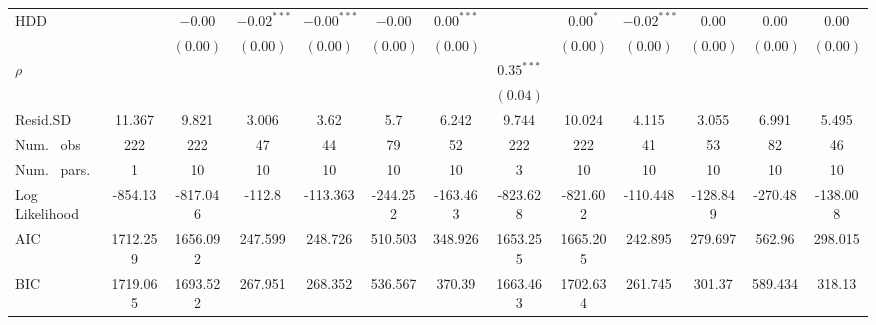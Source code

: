 \begin{table}
\begin{center}
\begin{tabular}{l c c c c c c c c c c c c}
HDD                               &               & $-0.00$       & $-0.02^{***}$ & $-0.00^{***}$  & $-0.00$        & $0.00^{***}$  &               & $0.00^{*}$    & $-0.02^{***}$ & $0.00$         & $0.00$        & $0.00$         \\
                                  &               & $(0.00)$      & $(0.00)$      & $(0.00)$       & $(0.00)$       & $(0.00)$      &               & $(0.00)$      & $(0.00)$      & $(0.00)$       & $(0.00)$      & $(0.00)$       \\
$\rho$                            &               &               &               &                &                &               & $0.35^{***}$  &               &               &                &               &                \\
                                  &               &               &               &                &                &               & $(0.04)$      &               &               &                &               &                \\
\hline
Resid.SD                          & 11.367        & 9.821         & 3.006         & 3.62           & 5.7            & 6.242         & 9.744         & 10.024        & 4.115         & 3.055          & 6.991         & 5.495          \\
Num. \ obs                        & 222           & 222           & 47            & 44             & 79             & 52            & 222           & 222           & 41            & 53             & 82            & 46             \\
Num. \ pars.                      & 1             & 10            & 10            & 10             & 10             & 10            & 3             & 10            & 10            & 10             & 10            & 10             \\
Log Likelihood                    & -854.13       & -817.046      & -112.8        & -113.363       & -244.252       & -163.463      & -823.628      & -821.602      & -110.448      & -128.849       & -270.48       & -138.008       \\
AIC                               & 1712.259      & 1656.092      & 247.599       & 248.726        & 510.503        & 348.926       & 1653.255      & 1665.205      & 242.895       & 279.697        & 562.96        & 298.015        \\
BIC                               & 1719.065      & 1693.522      & 267.951       & 268.352        & 536.567        & 370.39        & 1663.463      & 1702.634      & 261.745       & 301.37         & 589.434       & 318.13         \\

\end{tabular}
\end{center}
\end{table}
